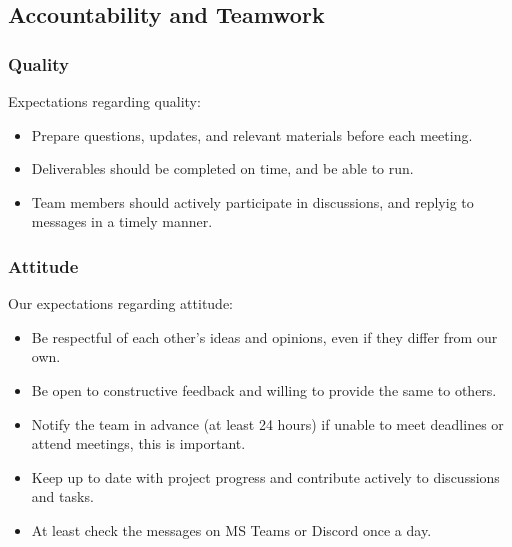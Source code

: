 \documentclass{article}
\begin{document}
\subsection*{Accountability and Teamwork}

\subsubsection*{Quality} 

Expectations regarding quality:
\begin{itemize}
  \item Prepare questions, updates, and relevant materials before each meeting.
  \item Deliverables should be completed on time, and be able to run.
  \item Team members should actively participate in discussions, and replyig to messages in a timely manner.
\end{itemize}

\subsubsection*{Attitude}


Our expectations regarding attitude:
\begin{itemize}
  \item Be respectful of each other's ideas and opinions, even if they differ from our own.
  \item Be open to constructive feedback and willing to provide the same to others.
  \item Notify the team in advance (at least 24 hours) if unable to meet deadlines or attend meetings, this is important.
  \item Keep up to date with project progress and contribute actively to discussions and tasks.
  \item At least check the messages on MS Teams or Discord once a day.
\end{itemize}
\end{document}
